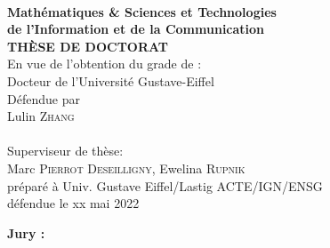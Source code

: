 \begin{titlepage}
\begin{center}
	
\vspace*{0.3cm}
 \\
\noindent \textbf{Math{\'e}matiques \& Sciences et Technologies\\de l’Information et de la Communication} \\
\vspace*{0.5cm}
\noindent \Huge \textbf{THÈSE DE DOCTORAT} \\
\vspace*{0.3cm}
\noindent \large {En vue de l’obtention du grade de :} \\
\vspace*{0.3cm}
\noindent \Large Docteur de l'Université Gustave-Eiffel\\
\vspace*{0.4cm}
\noindent \large {Défendue par\\}
\noindent \huge Lulin \textsc{Zhang} \\
\vspace*{0.8cm}
 \\
\vspace*{0.8cm}
\noindent \Large Superviseur de thèse: \\
Marc \textsc{Pierrot Deseilligny}, Ewelina \textsc{Rupnik}\\
\vspace*{0.2cm}
\noindent \Large préparé à Univ. Gustave Eiffel/Lastig ACTE/IGN/ENSG\\
\vspace*{0.2cm}
\noindent \large défendue le xx mai 2022 \\
\vspace*{0.5cm}
\end{center}
\noindent \large \textbf{Jury :} \\
\begin{center}

\end{center}
\end{titlepage}
